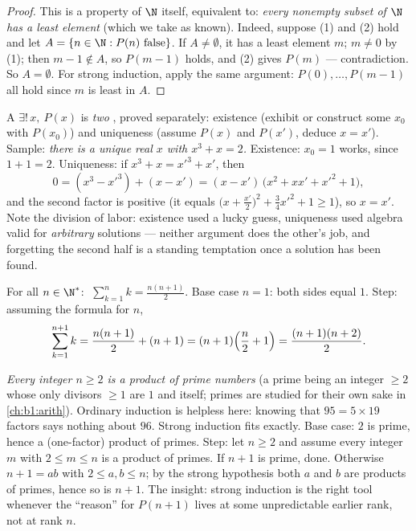 \begin{proof}
This is a property of $\N$ itself, equivalent to: \emph{every nonempty
subset of $\N$ has a least element} (which we take as known). Indeed,
suppose (1) and (2) hold and let $A = \{n \in \N : P(n)
\text{ false}\}$. If $A \neq \emptyset$, it has a least element $m$;
$m \neq 0$ by (1); then $m - 1 \notin A$, so $P(m-1)$ holds, and (2)
gives $P(m)$ --- contradiction. So $A = \emptyset$. For strong
induction, apply the same argument: $P(0), \dots, P(m-1)$ all hold
since $m$ is least in $A$.
\end{proof}

\begin{example}\label{ex:b1:logic:uniqueexistence}
A  $\exists!\,x,\ P(x)$ is \emph{two} , proved
separately: existence (exhibit or construct some $x_0$ with
$P(x_0)$) and uniqueness (assume $P(x)$ and $P(x')$, deduce $x =
x'$). Sample: \emph{there is a unique real $x$ with $x^3 + x =
2$.} Existence: $x_0 = 1$ works, since $1 + 1 = 2$. Uniqueness:
if $x^3 + x = x'^3 + x'$, then
\[
0 = (x^3 - x'^3) + (x - x')
= (x - x')\,\bigl(x^2 + xx' + x'^2 + 1\bigr),
\]
and the second factor is positive (it equals $\bigl(x +
\tfrac{x'}2\bigr)^2 + \tfrac34 x'^2 + 1 \geq 1$), so $x = x'$.
Note the division of labor: existence used a lucky guess,
uniqueness used algebra valid for \emph{arbitrary} solutions ---
neither argument does the other's job, and forgetting the second
half is a standing temptation once a solution has been found.
\end{example}

\begin{example}\label{ex:b1:logic:induction}
For all $n \in \N^*$: $\;\sum_{k=1}^n k = \frac{n(n+1)}{2}$. Base case
$n = 1$: both sides equal $1$. Step: assuming the formula for $n$,
\[
\sum_{k=1}^{n+1} k = \frac{n(n+1)}{2} + (n+1)
= (n+1)\Bigl(\frac n2 + 1\Bigr) = \frac{(n+1)(n+2)}{2}. \qedhere
\]
\end{example}

\begin{example}\label{ex:b1:logic:strongind}
\emph{Every integer $n \geq 2$ is a product of prime numbers} (a prime
being an integer $\geq 2$ whose only divisors $\geq 1$ are $1$ and
itself; primes are studied for their own sake in \cref{ch:b1:arith}).
Ordinary induction is helpless here: knowing that $95 = 5 \times 19$
factors says nothing about $96$. Strong induction fits exactly. Base
case: $2$ is prime, hence a (one-factor) product of primes. Step: let
$n \geq 2$ and assume every integer $m$ with $2 \leq m \leq n$ is a
product of primes. If $n + 1$ is prime, done. Otherwise $n + 1 = ab$
with $2 \leq a, b \leq n$; by the strong hypothesis both $a$ and $b$
are products of primes, hence so is $n + 1$. The insight: strong
induction is the right tool whenever the ``reason'' for $P(n+1)$ lives
at some unpredictable earlier rank, not at rank $n$.
\end{example}

